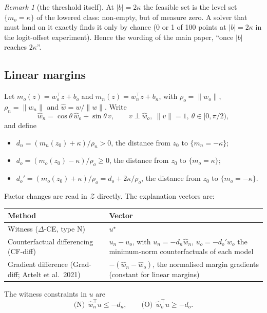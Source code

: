 \documentclass[10pt,a4paper]{article}
\theoremstyle{remark}
\newtheorem*{remark}{Remark}
\newcommand{\Z}{\mathcal Z}
\newcommand{\hw}{\hat w}
\newcommand{\norm}[1]{\lVert #1\rVert}
\newcommand{\DCE}{$\Delta$-CE}
\begin{document}
\begin{remark}[the threshold itself]
At $|b|=2\kappa$ the feasible set is the level set $\{m_o=\kappa\}$ of the lowered class: non-empty, but of measure zero. A solver that must land on it exactly finds it only by chance (0 or 1 of 100 points at $|b|=2\kappa$ in the logit-offset experiment). Hence the wording of the main paper, ``once $|b|$ reaches $2\kappa$''.
\end{remark}

\subsection{Linear margins}

Let $m_o(z)=w_o^\top z+b_o$ and $m_n(z)=w_n^\top z+b_n$, with $\rho_o=\norm{w_o}$, $\rho_n=\norm{w_n}$ and $\hw=w/\norm w$. Write
\[
\hw_n=\cos\theta\,\hw_o+\sin\theta\,v,\qquad v\perp\hw_o,\ \norm v=1,\ \theta\in[0,\pi/2),
\]
and define
\begin{itemize}
\item $d_n=(m_n(z_0)+\kappa)/\rho_n>0$, the distance from $z_0$ to $\{m_n=-\kappa\}$;
\item $d_o=(m_o(z_0)-\kappa)/\rho_o\ge0$, the distance from $z_0$ to $\{m_o=\kappa\}$;
\item $d_o'=(m_o(z_0)+\kappa)/\rho_o=d_o+2\kappa/\rho_o$, the distance from $z_0$ to $\{m_o=-\kappa\}$.
\end{itemize}
Factor changes are read in $\Z$ directly. The explanation vectors are:

\begin{center}
\begin{tabular}{@{}>{\raggedright\arraybackslash}p{5.2cm}>{\raggedright\arraybackslash}p{10cm}@{}}
\toprule
Method & Vector\\
\midrule
Witness (\DCE, type N) & $u^\star$\\
Counterfactual differencing (CF-diff) & $u_n-u_o$, with $u_n=-d_n\hw_n$, $u_o=-d_o'\hw_o$ the minimum-norm counterfactuals of each model\\
Gradient difference (Grad-diff; Artelt et al.\ 2021) & $-(\hw_n-\hw_o)$, the normalised margin gradients (constant for linear margins)\\
\bottomrule
\end{tabular}
\end{center}

The witness constraints in $u$ are
\[
\text{(N)}\ \ \hw_n^\top u\le-d_n,\qquad\text{(O)}\ \ \hw_o^\top u\ge-d_o .
\]
\end{document}
